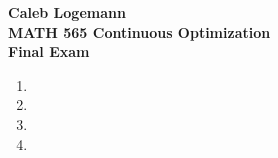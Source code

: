 \documentclass[11pt, oneside]{article}
\begin{document}
\noindent \textbf{\Large{Caleb Logemann \\
MATH 565 Continuous Optimization \\
Final Exam
}}

%
\begin{enumerate}
    \item %
      
    \item %
    \item %
    \item %
\end{enumerate}
\end{document}
